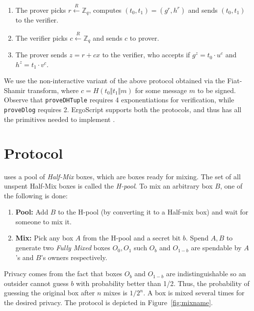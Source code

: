 \documentclass[runningheads]{llncs}
\newcommand{\langname}{ErgoScript\xspace}
\begin{document}
\begin{enumerate}
	\item The prover picks $r \stackrel{R}{\leftarrow} \mathbb{Z}_q$, computes $(t_0, t_1) = ({g}^r, {h}^r)$ and sends $(t_0, t_1)$ to the verifier.
	\item The verifier picks $c \stackrel{R}{\leftarrow} \mathbb{Z}_q$ and sends $c$ to prover.
	\item The prover sends $z = r + cx$ to the verifier, who accepts if ${g}^z = {t_0}\cdot {u}^c$ and $h^z=t_1\cdot v^c$.
\end{enumerate}

We use the non-interactive variant of the above protocol obtained via the Fiat-Shamir transform, where $c = H(t_0 \Vert t_1\Vert m)$ for some message $m$ to be signed.  Observe that \texttt{proveDHTuple} requires 4 exponentiations for verification, while \texttt{proveDlog} requires 2. \langname supports both the protocols, and thus has all the primitives needed to implement \algname.

\section{\algname Protocol}

\algname uses a pool of {\em Half-Mix} boxes, which are boxes ready for mixing. The set of all unspent Half-Mix boxes is called the {\em H-pool}. To mix an arbitrary box $B$, one of the following is done:
\begin{enumerate}
	\item \textbf{Pool:} Add $B$ to the H-pool (by converting it to a Half-mix box) and wait for someone to mix it.
	\item \textbf{Mix:} Pick any box $A$ from the H-pool and a secret bit $b$. Spend $A, B$ to generate two {\em Fully Mixed} boxes $O_0, O_1$ such $O_b$ and $O_{1-b}$ are spendable by $A$'s and $B$'s owners respectively.
\end{enumerate}

Privacy comes from the fact that boxes $O_b$ and $O_{1-b}$ are indistinguishable so an outsider cannot guess $b$ with probability better than 1/2. Thus, the probability of guessing the original box after $n$ mixes is $1/2^n$. A box is mixed several times for the desired privacy. The protocol is depicted in Figure~\ref{fig:mixname}. 
\end{document}

